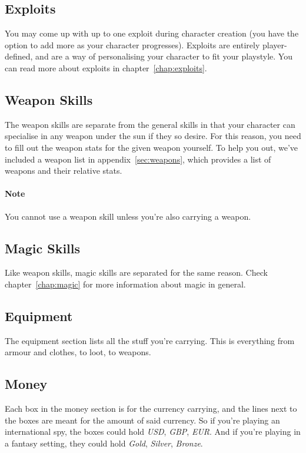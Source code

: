 \subsection{Exploits}
You may come up with up to one exploit during character creation (you have the option to add more as your character progresses).
Exploits are entirely player-defined, and are a way of personalising your character to fit your playstyle.
You can read more about exploits in chapter~\ref{chap:exploits}.

\subsection{Weapon Skills}
The weapon skills are separate from the general skills in that your character can specialise in any weapon under the sun if they so desire.
For this reason, you need to fill out the weapon stats for the given weapon yourself.
To help you out, we've included a weapon list in appendix~\ref{sec:weapons}, which provides a list of weapons and their relative stats.

\paragraph{Note} You cannot use a weapon skill unless you're also carrying a weapon.

\subsection{Magic Skills}
Like weapon skills, magic skills are separated for the same reason.
Check chapter~\ref{chap:magic} for more information about magic in general.

\subsection{Equipment}
The equipment section lists all the stuff you're carrying.
This is everything from armour and clothes, to loot, to weapons.

\subsection{Money}
Each box in the money section is for the currency carrying, and the lines next to the boxes are meant for the amount of said currency.
So if you're playing an international spy, the boxes could hold \textit{USD}, \textit{GBP}, \textit{EUR}.
And if you're playing in a fantasy setting, they could hold \textit{Gold}, \textit{Silver}, \textit{Bronze}.